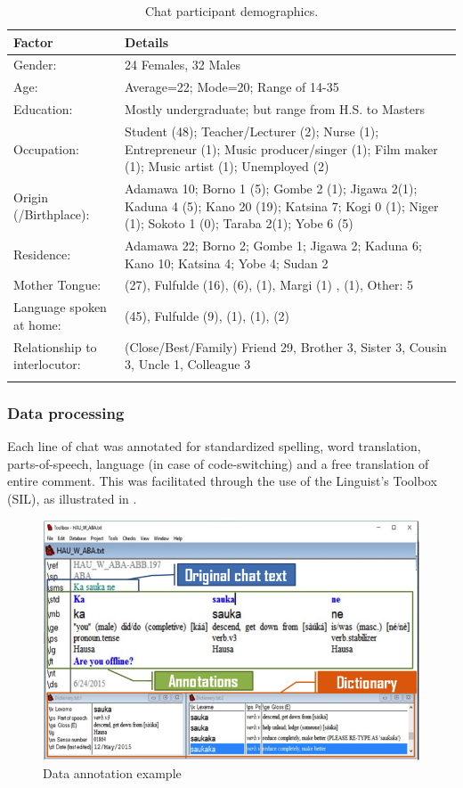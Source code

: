 \documentclass[output=paper
,newtxmath
,modfonts
,nonflat]{langsci/langscibook}
\begin{document}
\begin{table}
\begin{tabularx}{\textwidth}{lQ}
\lsptoprule
 Factor &  Details\\
\midrule
Gender: & 24 Females, 32 Males\\
Age: & Average=22; Mode=20; Range of 14-35\\
Education: & Mostly undergraduate; but range from H.S. to Masters\\
Occupation: & Student (48); Teacher/Lecturer (2); Nurse (1); Entrepreneur (1); Music producer/singer (1); Film maker (1); Music artist (1); Unemployed (2)\\
Origin (/Birthplace): & Adamawa 10; Borno 1 (5); Gombe 2 (1); Jigawa 2(1); Kaduna 4 (5); Kano 20 (19); Katsina 7; Kogi 0 (1); Niger (1); Sokoto 1 (0); Taraba 2(1); Yobe 6 (5)\\
Residence: & Adamawa 22; Borno 2; Gombe 1; Jigawa 2; Kaduna 6; Kano 10; Katsina 4; Yobe 4; Sudan 2\\
Mother Tongue: &  (27), Fulfulde (16),  (6),  (1), Margi (1) ,  (1), Other: 5\\
Language spoken at home: &  (45), Fulfulde (9),  (1),  (1),  (2)\\
Relationship to interlocutor: & (Close/Best/Family) Friend 29, Brother 3, Sister 3, Cousin 3, Uncle 1, Colleague 3\\
\lspbottomrule
\end{tabularx}  
\caption{Chat participant demographics.}
\label{tab:purvis:1}
\end{table} 

\subsubsection{Data processing}

Each line of chat was annotated for standardized spelling, word translation, parts-of-speech, language (in case of code-switching) and a free translation of entire comment. This was facilitated through the use of the Linguist’s Toolbox (SIL), as illustrated in .

 
\begin{figure}
\includegraphics[width=\textwidth]{figures/purvis-fig1.png}
\caption{Data annotation example}
\label{fig:purvis:1}
\end{figure}
 
\end{document}
